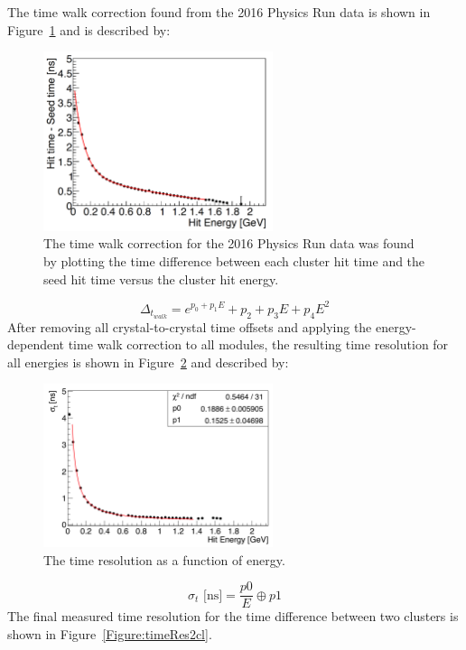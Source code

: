 The time walk correction found from the 2016 Physics Run data is shown in Figure~\ref{Figure:twalk} and is described by:
\begin{figure}[htb]
  \centering
      \includegraphics[width=0.6\textwidth]{pics/performance/twalk2016.png}
  \caption[Time walk correction for the Physics Run ECal data]{The time walk correction for the 2016 Physics Run data was found by plotting the time difference between each cluster hit time and the seed hit time versus the cluster hit energy.}
  \label{Figure:twalk}
\end{figure}
\begin{equation}
	\label{eq:twalkEq}
		\Delta_{t_{walk}} = e^{p_0+p_1E}+p_2+p_3E+p_4E^2	
\end{equation}
After removing all crystal-to-crystal time offsets and applying the energy-dependent time walk correction to all modules, the resulting time resolution for all energies is shown in Figure~\ref{Figure:timeRes} and described by:
\begin{figure}[htb]
  \centering
      \includegraphics[width=0.6\textwidth]{pics/performance/timeRes2016.png}
  \caption[Time resolution of the ECal for the 2016 run ]{The time resolution as a function of energy.}
  \label{Figure:timeRes}
\end{figure}
\begin{equation}
	\label{eq:twalkEqn}
		\sigma_t \textrm{ [ns]} = \dfrac{p0}{E}\oplus p1	
\end{equation}
The final measured time resolution for the time difference between two clusters is shown in Figure~\ref{Figure:timeRes2cl}.

